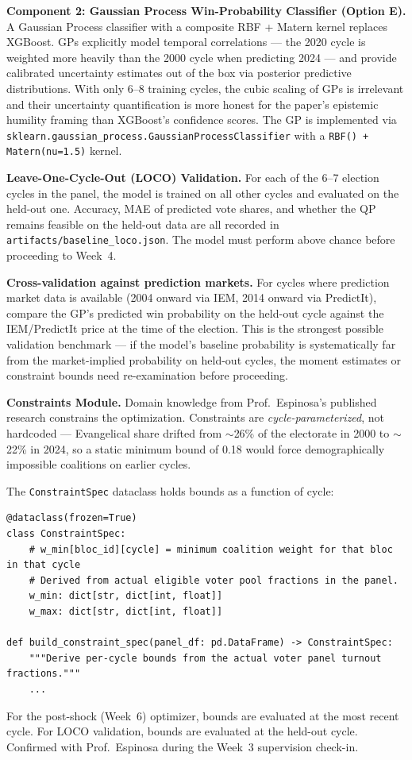 \documentclass[11pt]{article}
\begin{document}
\textbf{Component 2: Gaussian Process Win-Probability Classifier (Option E).}
A Gaussian Process classifier with a composite RBF + Matern kernel replaces XGBoost.
GPs explicitly model temporal correlations --- the 2020 cycle is weighted more heavily
than the 2000 cycle when predicting 2024 --- and provide calibrated uncertainty
estimates out of the box via posterior predictive distributions. With only 6--8
training cycles, the cubic scaling of GPs is irrelevant and their uncertainty
quantification is more honest for the paper's epistemic humility framing than
XGBoost's confidence scores. The GP is implemented via
\texttt{sklearn.gaussian\_process.GaussianProcessClassifier} with a
\texttt{RBF() + Matern(nu=1.5)} kernel.

\textbf{Leave-One-Cycle-Out (LOCO) Validation.}
For each of the 6--7 election cycles in the panel, the model is trained on all other
cycles and evaluated on the held-out one. Accuracy, MAE of predicted vote shares,
and whether the QP remains feasible on the held-out data are all recorded in
\texttt{artifacts/baseline\_loco.json}. The model must perform above chance before
proceeding to Week~4.

\textbf{Cross-validation against prediction markets.} For cycles where prediction
market data is available (2004 onward via IEM, 2014 onward via PredictIt), compare
the GP's predicted win probability on the held-out cycle against the IEM/PredictIt
price at the time of the election. This is the strongest possible validation benchmark
--- if the model's baseline probability is systematically far from the market-implied
probability on held-out cycles, the moment estimates or constraint bounds need
re-examination before proceeding.

\textbf{Constraints Module.}
Domain knowledge from Prof.\ Espinosa's published research constrains the optimization.
Constraints are \emph{cycle-parameterized}, not hardcoded --- Evangelical share drifted
from $\sim$26\% of the electorate in 2000 to $\sim$22\% in 2024, so a static
minimum bound of 0.18 would force demographically impossible coalitions on earlier cycles.

The \texttt{ConstraintSpec} dataclass holds bounds as a function of cycle:
\begin{lstlisting}
@dataclass(frozen=True)
class ConstraintSpec:
    # w_min[bloc_id][cycle] = minimum coalition weight for that bloc in that cycle
    # Derived from actual eligible voter pool fractions in the panel.
    w_min: dict[str, dict[int, float]]
    w_max: dict[str, dict[int, float]]

def build_constraint_spec(panel_df: pd.DataFrame) -> ConstraintSpec:
    """Derive per-cycle bounds from the actual voter panel turnout fractions."""
    ...
\end{lstlisting}
For the post-shock (Week~6) optimizer, bounds are evaluated at the most recent cycle.
For LOCO validation, bounds are evaluated at the held-out cycle. Confirmed with
Prof.\ Espinosa during the Week~3 supervision check-in.
\end{document}
